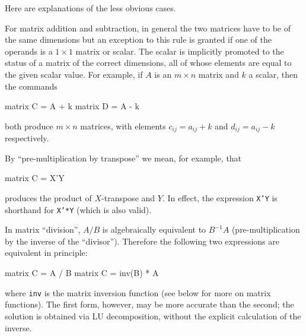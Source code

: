 Here are explanations of the less obvious cases. 

For matrix addition and subtraction, in general the two matrices have
to be of the same dimensions but an exception to this rule is granted
if one of the operands is a $1\times 1$ matrix or scalar.  The scalar
is implicitly promoted to the status of a matrix of the correct
dimensions, all of whose elements are equal to the given scalar value.
For example, if $A$ is an $m \times n$ matrix and $k$ a scalar, then
the commands
%
\begin{code}
matrix C = A + k
matrix D = A - k
\end{code}
%
both produce $m \times n$ matrices, with elements $c_{ij} = 
a_{ij} + k$ and $d_{ij} = a_{ij} - k$ respectively.

By ``pre-multiplication by transpose'' we mean, for example, that 
%
\begin{code}
matrix C = X'Y
\end{code}
%
produces the product of $X$-transpose and $Y$.  In effect, 
the expression \texttt{X'Y} is shorthand for \texttt{X'*Y}
(which is also valid).

In matrix ``division'', $A/B$ is algebraically equivalent to
$B^{-1}A$ (pre-multiplication by the inverse of the ``divisor'').
Therefore the following two expressions are equivalent in principle:
%
\begin{code}
matrix C = A / B
matrix C = inv(B) * A
\end{code}
%
where \texttt{inv} is the matrix inversion function (see below for
more on matrix functions).  The first form, however, may be more
accurate than the second; the solution is obtained via LU
decomposition, without the explicit calculation of the inverse.

